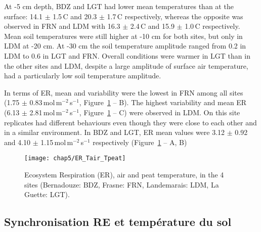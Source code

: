 At -5 cm depth, BDZ and LGT had lower mean temperatures than at the surface: 14.1 $\pm$ 1.5\,\textdegree C and 20.3 $\pm$ 1.7\,\textdegree C respectively, whereas the opposite was observed in FRN and LDM with 16.3 $\pm$ 2.4\,\textdegree C and 15.9 $\pm$ 1.0\,\textdegree C respectively.
Mean soil temperatures were still higher at -10 cm for both sites, but only in LDM at -20 cm.
At -30 cm the soil temperature amplitude ranged from 0.2 in LDM to 0.6 in LGT and FRN.
Overall conditions were warmer in LGT than in the other sites and LDM, despite a large amplitude of surface air temperature, had a particularly low soil temperature amplitude.

In terms of ER, mean and variability were the lowest in FRN among all sites (1.75 $\pm$ 0.83\,\textmu mol\,m$^{-2}$\,s$^{-1}$, Figure~\ref{fig:er_tair_tpeat} -- B).
The highest variability and mean ER (6.13 $\pm$ 2.81\,\textmu mol\,m$^{-2}$\,s$^{-1}$, Figure~\ref{fig:er_tair_tpeat} -- C) were observed in LDM.
On this site replicates had different behaviours even though they were close to each other and in a similar environment.
In BDZ and LGT, ER mean values were 3.12 $\pm$ 0.92 and 4.10 $\pm$ 1.15\,\textmu mol\,m$^{-2}$\,s$^{-1}$ respectively (Figure~\ref{fig:er_tair_tpeat} -- A, B)

\begin{figure}
\centering
\texttt{[image: chap5/ER\_Tair\_Tpeat]}
\caption{Ecosystem Respiration (ER), air and peat temperature, in the 4 sites (Bernadouze: BDZ, Frasne: FRN, Landemarais: LDM, La Guette: LGT).}
\label{fig:er_tair_tpeat}
\end{figure}


\subsection{Synchronisation RE et température du sol}


